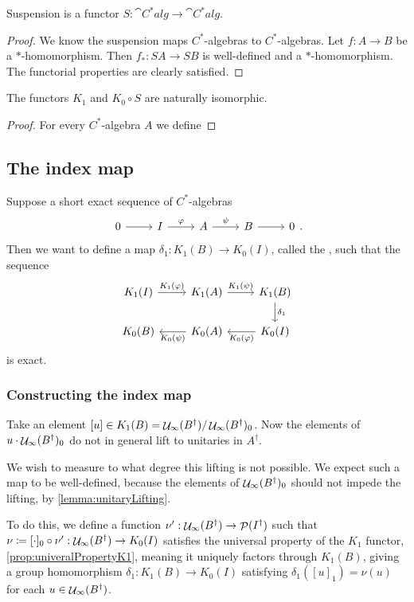 \begin{lemma}
Suspension is a functor $S: \cat{C^*alg} \to \cat{C^*alg}$.
\end{lemma}
\begin{proof}
We know the suspension maps $C^*$-algebras to $C^*$-algebras. Let $f: A\to B$ be a $*$-homomorphism. Then $f_*: SA \to SB$ is well-defined and a $*$-homomorphism. The functorial properties are clearly satisfied.
\end{proof}

\begin{theorem}
The functors $K_1$ and $K_0\circ S$ are naturally isomorphic.
\end{theorem}
\begin{proof}
For every $C^*$-algebra $A$ we define
\end{proof}


\subsection{The index map}
Suppose a short exact sequence of $C^*$-algebras
\[  \begin{tikzcd}
0 \rar & I \rar{\varphi} & A \rar{\psi} & B\rar & 0
\end{tikzcd}.\]
Then we want to define a map $\delta_1:  K_1(B)\to K_0(I)$, called the , such that the sequence
\[ \begin{tikzcd}
K_1(I) \rar{K_1(\varphi)} & K_1(A) \rar{K_1(\psi)} & K_1(B) \dar{\delta_1} \\
K_0(B) & K_0(A) \lar{K_0(\psi)} & K_0(I) \lar{K_0(\varphi)}
\end{tikzcd} \]
is exact.

\subsubsection{Constructing the index map}
Take an element $[u]\in K_1(B) = \mathop{\mathcal{U}}\nolimits_\infty(B^\dagger) / \mathop{\mathcal{U}}\nolimits_\infty(B^\dagger)_0$. Now the elements of $u\cdot \mathop{\mathcal{U}}\nolimits_\infty(B^\dagger)_0$ do not in general lift to unitaries in $A^\dagger$.

We wish to measure to what degree this lifting is not possible. We expect such a map to be well-defined, because the elements of $\mathop{\mathcal{U}}\nolimits_\infty(B^\dagger)_0$ should not impede the lifting, by \ref{lemma:unitaryLifting}.



To do this, we define a function $\nu': \mathop{\mathcal{U}}\nolimits_\infty(B^\dagger)\to \mathop{\mathcal{P}}\nolimits(I^\dagger)$ such that $\nu \coloneqq [\cdot]_0\circ \nu': \mathop{\mathcal{U}}\nolimits_\infty(B^\dagger)\to K_0(I)$ satisfies the universal property of the $K_1$ functor, \ref{prop:univeralPropertyK1}, meaning it uniquely factors through $K_1(B)$, giving a group homomorphism $\delta_1: K_1(B)\to K_0(I)$ satisfying $\delta_1([u]_1) = \nu(u)$ for each $u\in\mathop{\mathcal{U}}\nolimits_\infty(B^\dagger)$.


